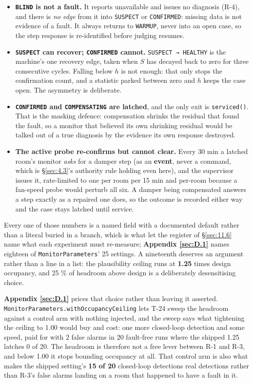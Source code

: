 \begin{itemize}
\tightlist
\item \textbf{\texttt{BLIND} is not a fault.} It reports unavailable and issues no diagnosis (R-4),
  and there is \emph{no edge} from it into \texttt{SUSPECT} or \texttt{CONFIRMED}: missing data is
  not evidence of a fault. It always returns to \texttt{WARMUP}, never into an open case, so the step
  response is re-identified before judging resumes.
\item \textbf{\texttt{SUSPECT} can recover; \texttt{CONFIRMED} cannot.} \texttt{SUSPECT → HEALTHY}
  is the machine's one recovery edge, taken when $S$ has decayed back to zero for three
  consecutive cycles. Falling below $h$ is not enough: that only stops the confirmation count,
  and a statistic parked between zero and $h$ keeps the case open. The asymmetry is deliberate.
\item \textbf{\texttt{CONFIRMED} and \texttt{COMPENSATING} are latched}, and the only exit is
  \texttt{serviced()}. That is the masking defence: compensation shrinks the residual that found the
  fault, so a monitor that believed its own shrinking residual would be talked out of a true
  diagnosis by the evidence its own response destroyed.
\item \textbf{The active probe re-confirms but cannot clear.} Every 30 min a latched room's monitor
  \emph{asks} for a damper step (as an \textbf{event}, never a command, which is §\ref{sec:4.3}'s authority
  rule holding even here), and the supervisor issues it, rate-limited to one per room per 15 min and
  per-room because a fan-speed probe would perturb all six. A damper being compensated answers a step
  exactly as a repaired one does, so the outcome is recorded either way and the case stays latched
  until service.
\end{itemize}

Every one of those numbers is a named field with a documented default rather than a literal buried
in a branch, which is what let the register of §\ref{sec:11.6} name what each experiment must re-measure;
\textbf{Appendix \ref{sec:D.1}} names eighteen of \texttt{MonitorParameters}' 25 settings. A nineteenth deserves an
argument rather than a line in a list: the plausibility ceiling runs at \textbf{1.25} times design occupancy, and 25 \% of headroom
above design is a deliberately desensitising choice.

\textbf{Appendix \ref{sec:D.1}} prices that choice rather than leaving it asserted.
\texttt{MonitorParameters.\allowbreak withOccupancyCeiling} lets T-24 sweep the headroom against a control arm
with nothing injected, and the sweep says what tightening the ceiling to 1.00 would buy and cost: one
more closed-loop detection and some speed, paid for with 2 false alarms in 20 fault-free runs where
the shipped 1.25 latches 0 of 20. The headroom is therefore not a free lever between R-1 and R-3, and
below 1.00 it stops bounding occupancy at all. That control arm is also what makes the shipped
setting's \textbf{15 of 20} closed-loop detections real detections rather than R-3's false alarms
landing on a room that happened to have a fault in it.

